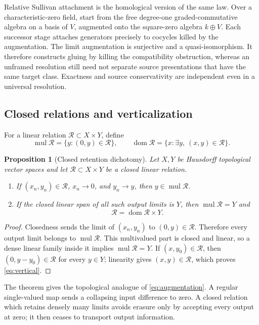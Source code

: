 \documentclass[11pt]{article}
\newtheorem{proposition}[theorem]{Proposition}
\theoremstyle{definition}
\theoremstyle{remark}
\newcommand{\cR}{\mathcal R}
\newcommand{\mul}{\operatorname{mul}}
\newcommand{\dom}{\operatorname{dom}}
\begin{document}
Relative Sullivan attachment is the homological version of the same law.
Over a characteristic-zero field, start from the free degree-one
graded-commutative algebra on a basis of \(V\), augmented onto the
square-zero algebra \(k\oplus V\).  Each successor
stage attaches generators precisely to cocycles killed by the augmentation.
The limit augmentation is surjective and a quasi-isomorphism.  It therefore
constructs gluing by killing the compatibility obstruction, whereas an
unframed resolution still need not separate source presentations that have
the same target class.  Exactness and source conservativity are independent
even in a universal resolution.

\subsection{Closed relations and verticalization}

For a linear relation \(\cR\subset X\times Y\), define
\[
 \mul\cR=\{y:(0,y)\in\cR\},\qquad
 \dom\cR=\{x:\exists y,\ (x,y)\in\cR\}.
\]

\begin{proposition}[Closed retention dichotomy]
\label{prop:closed-retention}
Let \(X,Y\) be Hausdorff topological vector spaces and let
\(\cR\subset X\times Y\) be a closed linear relation.

\begin{enumerate}[label=\textup{(\roman*)},leftmargin=2em]
\item If \((x_n,y_n)\in\cR\), \(x_n\to0\), and \(y_n\to y\), then
      \(y\in\mul\cR\).
\item If the closed linear span of all such output limits is \(Y\), then
      \(\mul\cR=Y\) and
      \[
                        \cR=\dom\cR\times Y.
      \tag{2.13}\label{eq:vertical}
      \]
\end{enumerate}
\end{proposition}

\begin{proof}
Closedness sends the limit of \((x_n,y_n)\) to
\((0,y)\in\cR\).  Therefore every output limit belongs to
\(\mul\cR\).  This multivalued part is closed and linear, so a dense
linear family inside it implies \(\mul\cR=Y\).  If
\((x,y_0)\in\cR\), then \((0,y-y_0)\in\cR\) for every \(y\in Y\);
linearity gives \((x,y)\in\cR\), which proves
\eqref{eq:vertical}.
\end{proof}

The theorem gives the topological analogue of
\eqref{eq:augmentation}.  A regular single-valued map sends a collapsing
input difference to zero.  A closed relation which retains densely many
limits avoids erasure only by accepting every output at zero; it then
ceases to transport output information.
\end{document}
